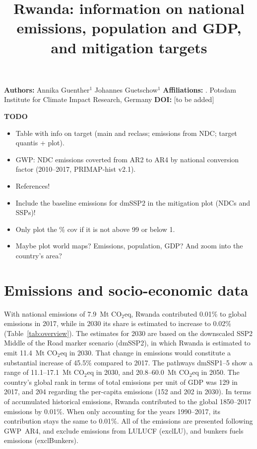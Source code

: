 \documentclass[12pt]{article}
\title{ \bfseries \color{PIKorange} Rwanda: information on national emissions, population and GDP, and mitigation targets}
\begin{document}
 \maketitle

 \noindent \textbf{Authors:} \newline
 \indent Annika Guenther$^{1}$ \newline
 \indent Johannes Guetschow$^{1}$ \newline
 \noindent \textbf{Affiliations:} \newline
 . Potsdam Institute for Climate Impact Research, Germany \newline
 \noindent \textbf{DOI:} [to be added] \newline

 \textbf{TODO}
 \begin{itemize}
 \item Table with info on target (main and reclass; emissions from NDC; target quantis + plot).
 \item GWP: NDC emissions coverted from AR2 to AR4 by national conversion factor (2010--2017, PRIMAP-hist v2.1).
 \item References!
 \item Include the baseline emissions for dmSSP2 in the mitigation plot (NDCs and SSPs)!
 \item Only plot the \% cov if it is not above 99 or below 1.
 \item Maybe plot world maps? Emissions, population, GDP? And zoom into the country's area?
 \end{itemize}

 \newpage %
 \section{Emissions and socio-economic data}
 \label{sec:nonLULUCFSocioEco}
 With national emissions of 7.9~Mt CO$_2$eq, Rwanda contributed 0.01\% to global emissions in 2017, while in 2030 its share is estimated to increase to 0.02\% (Table~\ref{tab:overview}).
 The estimates for 2030 are based on the downscaled SSP2 Middle of the Road marker scenario (dmSSP2), in which Rwanda is estimated to emit 11.4~Mt CO$_2$eq in 2030.
 That change in emissions would constitute a substantial increase of 45.5\% compared to 2017. 
 The pathways dmSSP1--5 show a range of 11.1--17.1~Mt CO$_2$eq in 2030, and 20.8--60.0~Mt CO$_2$eq in 2050.
 The country's global rank in terms of total emissions per unit of GDP was 129 in 2017, and 204 regarding the per-capita emissions (152 and 202 in 2030).
 In terms of accumulated historical emissions, Rwanda contributed to the global 1850--2017 emissions by 0.01\%. 
 When only accounting for the years 1990--2017, its contribution stays the same to 0.01\%.
 All of the emissions are presented following GWP~AR4, and exclude emissions from LULUCF (exclLU), and bunkers fuels emissions (exclBunkers).
\end{document}
